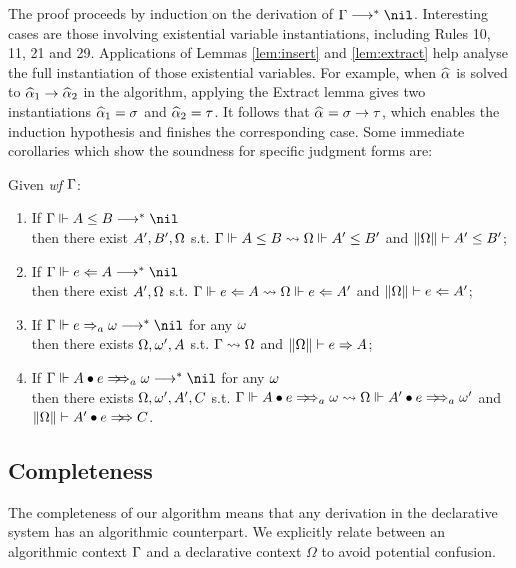 The proof proceeds by induction on the derivation of $\Gm\redto\nil$.
Interesting cases are those involving existential variable instantiations,
including Rules 10, 11, 21 and 29.
Applications of Lemmas \ref{lem:insert} and \ref{lem:extract}
help analyse the full instantiation of those existential variables.
For example, when $\al$ is solved to $\al[1] \to \al[2]$ in the algorithm,
applying the Extract lemma gives two instantiations $\al[1] = \sigma$ and $\al[2] = \tau$.
It follows that $\al = \sigma \to \tau$, which enables the induction hypothesis
and finishes the corresponding case. Some immediate corollaries which
show the soundness for specific judgment forms are: 


\begin{corollary}
Given \emph{wf }$\Gamma$:
\begin{enumerate}
    \item If $\Gm \Vdash A \le B \redto \nil$\\
        then there exist $A', B', \Omega$ s.t.
        $\Gamma \Vdash A \le B \rightsquigarrow \Omega \Vdash A' \le B'$ and $\|\Omega\| \vdash A' \le B'$;
    \item If $\Gm \Vdash e \Lto A \redto \nil$\\
        then there exist $ A', \Omega$ s.t.
        $\Gamma \Vdash e \Leftarrow A \rightsquigarrow \Omega \Vdash e \Leftarrow A'$ and $\|\Omega\| \vdash e \Leftarrow A'$;
    \item If $\Gm \Vdash e \To_a \jg \redto \nil$ for any $\omega$\\
        then there exists $\Omega, \omega', A$ s.t.
        $\Gamma \rightsquigarrow \Omega$ and $\|\Omega\| \vdash e \Rightarrow A$;
    \item If $\Gm \Vdash \appInfAlg{A}{e} \redto \nil$ for any $\omega$\\
        then there exists $\Omega, \omega', A', C$ s.t.
        $\Gm \Vdash \appInfAlg{A}{e} \sto \Om \Vdash \appInfAlg{A'}{e}[a][\jg']$
            and $\|\Om\| \vdash \appInf{A'}{e}{C}$.
\end{enumerate}
\end{corollary}

\subsection{Completeness}

The completeness of our algorithm means that any derivation in the
declarative system has an algorithmic counterpart.
We explicitly relate between an algorithmic context $\Gamma$ and
a declarative context $\Omega$ to avoid potential confusion.

